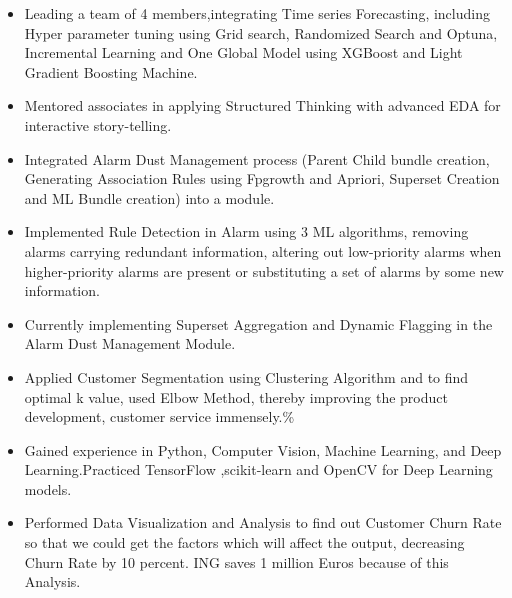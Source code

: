 \documentclass[10pt,a4paper,ragged2e,withhyper]{altacv}
\author{Rashmita Karak}
\date{\today}
\title{}
\begin{document}

\makecvheader

\begin{paracol}{2}
\label{sec:orgc7cf794}
\begin{itemize}
\item Leading a team of 4 members,integrating Time series Forecasting, including Hyper parameter tuning using Grid search, Randomized Search and Optuna, Incremental Learning and One Global Model using XGBoost and Light Gradient Boosting Machine.
\item Mentored associates in applying Structured Thinking with advanced EDA for interactive story-telling.
\item Integrated Alarm Dust Management process (Parent Child bundle creation, Generating Association Rules using Fpgrowth and Apriori, Superset Creation and ML Bundle creation) into a module.
\item Implemented Rule Detection in Alarm using 3 ML algorithms, removing alarms carrying redundant information, altering out low-priority alarms when higher-priority alarms are present or substituting a set of alarms by some new information. 
\item Currently implementing Superset Aggregation and Dynamic Flagging in the Alarm Dust Management Module.
\end{itemize}

\par\divider
{}
\begin{itemize}
\item Applied Customer Segmentation using Clustering Algorithm and to find optimal k value, used Elbow Method, thereby improving the product development, customer service immensely.\%
\item Gained experience in Python, Computer Vision, Machine Learning, and Deep Learning.Practiced TensorFlow ,scikit-learn and OpenCV for Deep Learning models.
\item Performed Data Visualization and Analysis to find out Customer Churn Rate so that we could get the factors which will affect the output, decreasing Churn Rate by 10 percent. ING saves 1 million Euros because of this Analysis.
\end{itemize}


\end{paracol}
\end{document}
